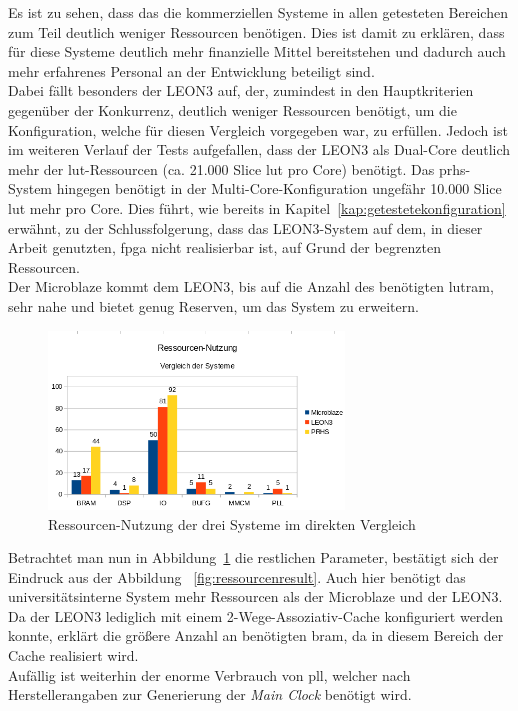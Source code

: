 Es ist zu sehen, dass das die kommerziellen Systeme in allen getesteten Bereichen zum Teil deutlich weniger Ressourcen benötigen.
Dies ist damit zu erklären, dass für diese Systeme deutlich mehr finanzielle Mittel bereitstehen und dadurch auch mehr
erfahrenes Personal an der Entwicklung beteiligt sind.\\
Dabei fällt besonders der LEON3 auf, der, zumindest in den Hauptkriterien gegenüber der Konkurrenz, deutlich weniger Ressourcen
benötigt, um die Konfiguration, welche für diesen Vergleich vorgegeben war, zu erfüllen. Jedoch ist im weiteren Verlauf der Tests aufgefallen, dass der LEON3 als Dual-Core deutlich mehr
 der \ac{lut}-Ressourcen (ca. 21.000 Slice \ac{lut} pro Core) benötigt. Das \ac{prhs}-System hingegen benötigt in der Multi-Core-Konfiguration ungefähr 10.000 Slice \ac{lut} mehr pro Core.
Dies führt, wie bereits in Kapitel~\ref{kap:getestetekonfiguration} erwähnt, zu der Schlussfolgerung, dass das LEON3-System auf dem, in dieser Arbeit genutzten, \ac{fpga} nicht realisierbar ist,
auf Grund der begrenzten Ressourcen.\\
 Der Microblaze kommt dem LEON3, bis auf die Anzahl des benötigten \ac{lutram}, sehr nahe und bietet genug Reserven, um das System zu erweitern.\\

\begin{figure}[H]
\centering
\includegraphics[width=0.7\textwidth]{Hauptteil/ressourcenresult1.png}
\caption{Ressourcen-Nutzung der drei Systeme im direkten Vergleich}
\label{fig:ressourcenresult1}
\end{figure}

Betrachtet man nun in Abbildung~\ref{fig:ressourcenresult1} die restlichen Parameter, bestätigt sich der Eindruck aus der Abbildung
~\ref{fig:ressourcenresult}. Auch hier benötigt das universitätsinterne System mehr Ressourcen als der Microblaze und der LEON3.
Da der LEON3 lediglich mit einem 2-Wege-Assoziativ-Cache konfiguriert werden konnte, erklärt die größere Anzahl an
benötigten \ac{bram}, da in diesem Bereich der Cache realisiert wird.\\
Aufällig ist weiterhin der enorme Verbrauch von \ac{pll}, welcher nach Herstellerangaben zur Generierung der \emph{Main Clock}
benötigt wird.\\

